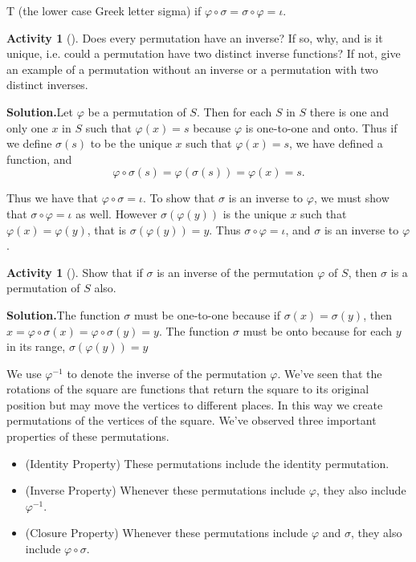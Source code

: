 \documentclass[10pt,]{book}
\theoremstyle{plain}
\theoremstyle{definition}
\newtheorem{activity}[project]{Activity}
\numberwithin{equation}{chapter}
\begin{document}
\rightarrow T\) (the lower case Greek letter sigma) if \(\varphi\circ \sigma= \sigma
\circ\varphi =
\iota\).%
\begin{activity}[]\label{activity-239}
Does every permutation have an inverse? If so, why, and is it unique, i.e. could a permutation have two distinct inverse functions? If not, give an example of a permutation without an inverse or a permutation with two distinct inverses.%
\par\medskip\noindent%
\textbf{Solution.}\quad Let \(\varphi\) be a permutation of \(S\). Then for each \(S\) in \(S\) there is one and only one \(x\) in \(S\) such that \(\varphi(x) = s\) because \(\varphi\) is one-to-one and onto. Thus if we define \(\sigma(s)\) to be the unique \(x\) such that \(\varphi(x) = s\), we have defined a function, and%
\begin{equation*}
\varphi\circ\sigma (s) = \varphi(\sigma(s)) = \varphi(x) = s.
\end{equation*}
%
\par
Thus we have that \(\varphi\circ\sigma = \iota\). To show that \(\sigma\) is an inverse to \(\varphi\), we must show that \(\sigma\circ\varphi = \iota\) as well. However \(\sigma(\varphi(y))\) is the unique \(x\) such that \(\varphi(x) = \varphi(y)\), that is \(\sigma(\varphi(y)) = y\). Thus \(\sigma\circ\varphi = \iota\), and \(\sigma\) is an inverse to \(\varphi\).%
\end{activity}
\begin{activity}[]\label{activity-240}
Show that if \(\sigma\) is an inverse of the permutation \(\varphi\) of \(S\), then \(\sigma\) is a permutation of \(S\) also.%
\par\medskip\noindent%
\textbf{Solution.}\quad The function \(\sigma\) must be one-to-one because if \(\sigma(x)=\sigma(y)\), then \(x=\varphi\circ\sigma(x)=\varphi\circ\sigma(y)=y\). The function \(\sigma\) must be onto because for each \(y\) in its range, \(\sigma(\varphi(y)) = y\)%
\end{activity}
We use \(\varphi^{-1}\) to denote the inverse of the permutation \(\varphi\). We've seen that the rotations of the square are functions that return the square to its original position but may move the vertices to different places. In this way we create permutations of the vertices of the square. We've observed three important properties of these permutations. \leavevmode%
\begin{itemize}[label=\textbullet]
\item{}(Identity Property) These permutations include the identity permutation.%
\item{}(Inverse Property) Whenever these permutations include \(\varphi\), they also include \(\varphi^{-1}\).%
\item{}(Closure Property)  Whenever these permutations include \(\varphi\) and \(\sigma\), they also include \(\varphi\circ\sigma\).%
\end{itemize}
\end{document}

